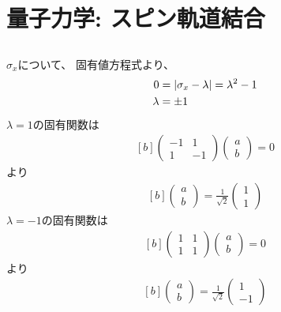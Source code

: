 \documentclass[../ap_2014.tex]{subfiles}
\begin{document}
\setcounter{chapter}{0}
\chapter{量子力学: スピン軌道結合}
\section{}
\(\sigma_x\)について、
固有値方程式より、
\begin{equation}\begin{aligned}[b]
    0 &= \abs{\sigma_x-\lambda}=\lambda^2-1\\
    \lambda &= \pm 1
\end{aligned}\end{equation}
\(\lambda=1\)の固有関数は
\begin{equation}\begin{aligned}[b]
    \begin{pmatrix}
        -1 & 1\\
        1 & -1
    \end{pmatrix}\begin{pmatrix}
        a\\b
    \end{pmatrix} = 0
\end{aligned}\end{equation}
より
\begin{equation}\begin{aligned}[b]
    \begin{pmatrix}
        a\\b
    \end{pmatrix}
    = \frac{1}{\sqrt{2}}
    \begin{pmatrix}
        1 \\ 1
    \end{pmatrix}
\end{aligned}\end{equation}
\(\lambda=-1\)の固有関数は
\begin{equation}\begin{aligned}[b]
    \begin{pmatrix}
        1 & 1\\
        1 & 1
    \end{pmatrix}\begin{pmatrix}
        a\\b
    \end{pmatrix} = 0
\end{aligned}\end{equation}
より
\begin{equation}\begin{aligned}[b]
    \begin{pmatrix}
        a\\b
    \end{pmatrix}
    = \frac{1}{\sqrt{2}}
    \begin{pmatrix}
        1 \\ -1
    \end{pmatrix}
\end{aligned}\end{equation}
\end{document}

